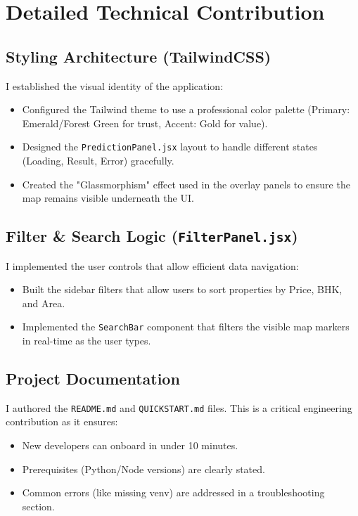 \documentclass[12pt, a4paper]{article}
\begin{document}
\section{Detailed Technical Contribution}

\subsection{Styling Architecture (TailwindCSS)}
I established the visual identity of the application:
\begin{itemize}
    \item Configured the Tailwind theme to use a professional color palette (Primary: Emerald/Forest Green for trust, Accent: Gold for value).
    \item Designed the \texttt{PredictionPanel.jsx} layout to handle different states (Loading, Result, Error) gracefully.
    \item Created the "Glassmorphism" effect used in the overlay panels to ensure the map remains visible underneath the UI.
\end{itemize}

\subsection{Filter & Search Logic (\texttt{FilterPanel.jsx})}
I implemented the user controls that allow efficient data navigation:
\begin{itemize}
    \item Built the sidebar filters that allow users to sort properties by Price, BHK, and Area.
    \item Implemented the \texttt{SearchBar} component that filters the visible map markers in real-time as the user types.
\end{itemize}

\subsection{Project Documentation}
I authored the \texttt{README.md} and \texttt{QUICKSTART.md} files. This is a critical engineering contribution as it ensures:
\begin{itemize}
    \item New developers can onboard in under 10 minutes.
    \item Prerequisites (Python/Node versions) are clearly stated.
    \item Common errors (like missing venv) are addressed in a troubleshooting section.
\end{itemize}
\end{document}
